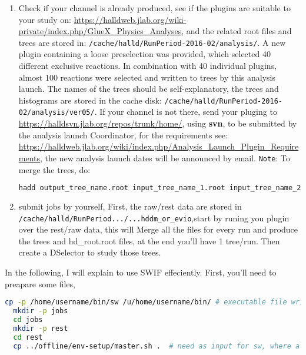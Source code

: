 \documentclass{article}
\begin{document}
\begin{enumerate}
\item Check if your channel is already produced, see if the plugins are suitable to your study on: \url{https://halldweb.jlab.org/wiki-private/index.php/GlueX_Physics_Analyses}, and the related root files and trees are stored in: \texttt{/cache/halld/RunPeriod-2016-02/analysis/}. A new plugin containing a loose preselection was provided, which selected 40 different exclusive reactions. In combination with 40 individual plugins, almost 100 reactions were selected and written to trees by this analysis launch. The names of the trees should be self-explanatory, the trees and histograms are stored in the cache disk: \texttt{/cache/halld/RunPeriod-2016-02/analysis/ver05/}.
\newline If your channel is not there, send your pluging to \url{https://halldsvn.jlab.org/repos/trunk/home/}, using \textbf{svn}, to be submitted by the analysis launch Coordinator, for the requirements see: \url{https://halldweb.jlab.org/wiki/index.php/Analysis_Launch_Plugin_Requirements}, the new analysis launch dates will be announced by email.
  \newline \texttt{Note}: To merge the trees, do:
  \begin{lstlisting}[language=bash]
    hadd output_tree_name.root input_tree_name_1.root input_tree_name_2.root ...
  \end{lstlisting}
\item  submit jobs by yourself, First, the raw/rest data are stored in \texttt{/cache/halld/RunPeriod.../...hddm\_or\_evio},start by runing you plugin over the rest/raw data, this will Merge all the files for every run and produce the trees and hd\_root.root files, at the end you'll have 1 tree/run. Then create a DSelector to study those trees.
\end{enumerate}

In the following, I will explain to use SWIF effeciently.
\newline First, you'll need to preapare some files,
\begin{lstlisting}[language=bash]
  cp -p /home/username/bin/sw /u/home/username/bin/ # executable file written with go language, to submit jobs in good conditions
  mkdir -p jobs
  cd jobs
  mkdir -p rest
  cd rest
  cp ../offline/env-setup/master.sh .  # need as input for sw, where all the environment variables are defined.
\end{lstlisting} 
\end{document}
